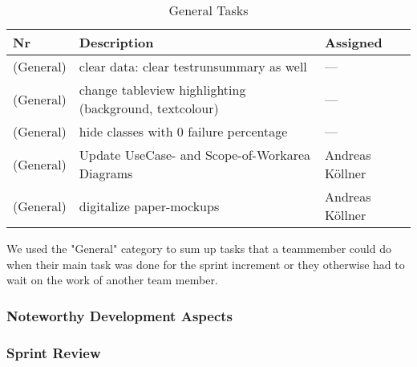 \begin{table}[h]
  \caption{General Tasks}
  \label{General Tasks}
  \centering
  \begin{tabular}{p{1cm}|p{5cm}|p{3cm}|}
  	Nr & Description & Assigned \\ 
  	\hline
  	(General) & clear data: clear testrunsummary as well & --- \\ 
  	\hline
  	(General) & change tableview highlighting (background, textcolour) & --- \\ 
  	\hline
  	(General) & hide classes with 0 failure percentage & --- \\ 
  	\hline
  	(General) & Update UseCase- and Scope-of-Workarea Diagrams & Andreas Köllner \\ 
  	\hline
  	(General) & digitalize paper-mockups & Andreas Köllner \\ 
  	\hline
  \end{tabular}
\end{table}
We used the "General" category to sum up tasks that a teammember could do when their main task was done for the sprint increment or they otherwise had to wait on the work of another team member. 

\subsubsection*{Noteworthy Development Aspects}

\subsubsection*{Sprint Review}


